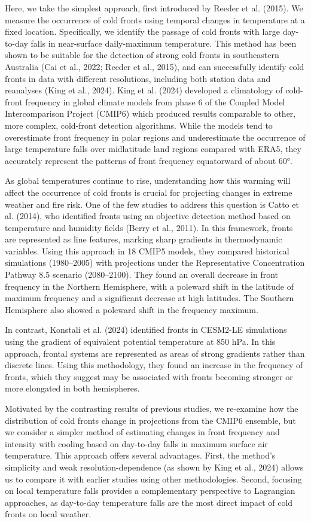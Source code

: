 \documentclass[
]{agujournal2019}
\begin{document}
Here, we take the simplest approach, first introduced by Reeder et al.
(2015). We measure the occurrence of cold fronts using temporal changes
in temperature at a fixed location. Specifically, we identify the
passage of cold fronts with large day-to-day falls in near-surface
daily-maximum temperature. This method has been shown to be suitable for
the detection of strong cold fronts in southeastern Australia (Cai et
al., 2022; Reeder et al., 2015), and can successfully identify cold
fronts in data with different resolutions, including both station data
and reanalyses (King et al., 2024). King et al. (2024) developed a
climatology of cold-front frequency in global climate models from phase
6 of the Coupled Model Intercomparison Project (CMIP6) which produced
results comparable to other, more complex, cold-front detection
algorithms. While the models tend to overestimate front frequency in
polar regions and underestimate the occurrence of large temperature
falls over midlatitude land regions compared with ERA5, they accurately
represent the patterns of front frequency equatorward of about 60°.

As global temperatures continue to rise, understanding how this warming
will affect the occurrence of cold fronts is crucial for projecting
changes in extreme weather and fire risk. One of the few studies to
address this question is Catto et al. (2014), who identified fronts
using an objective detection method based on temperature and humidity
fields (Berry et al., 2011). In this framework, fronts are represented
as line features, marking sharp gradients in thermodynamic variables.
Using this approach in 18 CMIP5 models, they compared historical
simulations (1980--2005) with projections under the Representative
Concentration Pathway 8.5 scenario (2080--2100). They found an overall
decrease in front frequency in the Northern Hemisphere, with a poleward
shift in the latitude of maximum frequency and a significant decrease at
high latitudes. The Southern Hemisphere also showed a poleward shift in
the frequency maximum.

In contrast, Konstali et al. (2024) identified fronts in CESM2-LE
simulations using the gradient of equivalent potential temperature at
850 hPa. In this approach, frontal systems are represented as areas of
strong gradients rather than discrete lines. Using this methodology,
they found an increase in the frequency of fronts, which they suggest
may be associated with fronts becoming stronger or more elongated in
both hemispheres.

Motivated by the contrasting results of previous studies, we re-examine
how the distribution of cold fronts change in projections from the CMIP6
ensemble, but we consider a simpler method of estimating changes in
front frequency and intensity with cooling based on day-to-day falls in
maximum surface air temperature. This approach offers several
advantages. First, the method's simplicity and weak
resolution-dependence (as shown by King et al., 2024) allows us to
compare it with earlier studies using other methodologies. Second,
focusing on local temperature falls provides a complementary perspective
to Lagrangian approaches, as day-to-day temperature falls are the most
direct impact of cold fronts on local weather.
\end{document}

